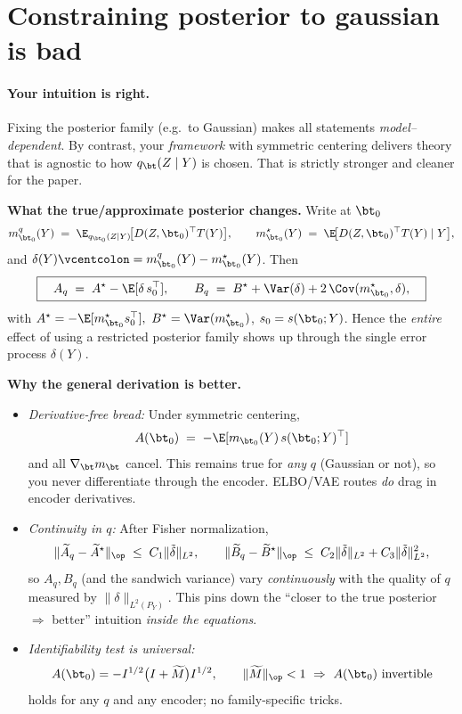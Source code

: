 \section{Constraining posterior to gaussian is bad}

\paragraph{Your intuition is right.} 
Fixing the posterior family (e.g.\ to Gaussian) makes all statements \emph{model–dependent}. 
By contrast, your \emph{framework} with symmetric centering delivers theory that is agnostic to how $q_\bt(Z\mid Y)$ is chosen. 
That is strictly stronger and cleaner for the paper.

\medskip
\noindent\textbf{What the true/approximate posterior changes.}
Write at $\bt_0$
\[
m_{\bt_0}^q(Y)\;=\;\E_{q_{\bt_0}(Z\mid Y)}\!\big[D(Z,\bt_0)^\top T(Y)\big],
\qquad
m_{\bt_0}^\star(Y)\;=\;\E\!\big[D(Z,\bt_0)^\top T(Y)\mid Y\big],
\]
and $\delta(Y)\vcentcolon=m_{\bt_0}^q(Y)-m_{\bt_0}^\star(Y)$. Then
\[
\boxed{\quad
A_q \;=\; A^\star - \E[\delta\,s_0^\top],\qquad
B_q \;=\; B^\star + \Var(\delta)+2\,\Cov(m^\star_{\bt_0},\delta),
\quad}
\]
with $A^\star=-\E[m^\star_{\bt_0}s_0^\top],~ B^\star=\Var(m^\star_{\bt_0})$, $s_0=s(\bt_0;Y)$. 
Hence the \emph{entire} effect of using a restricted posterior family shows up through the single error process $\delta(Y)$.

\medskip
\noindent\textbf{Why the general derivation is better.}
\begin{itemize}
\item \emph{Derivative-free bread:} Under symmetric centering,
\[
A(\bt_0)\;=\;-\E[m_{\bt_0}(Y)\,s(\bt_0;Y)^\top]
\]
and all $\nabla_\bt m_\bt$ cancel. This remains true for \emph{any} $q$ (Gaussian or not), so you never differentiate through the encoder. ELBO/VAE routes \emph{do} drag in encoder derivatives.
\item \emph{Continuity in $q$:} After Fisher normalization,
\[
\|\widetilde A_q-\widetilde A^\star\|_{\op}
\;\le\;C_1\|\tilde\delta\|_{L^2},\qquad
\|\widetilde B_q-\widetilde B^\star\|_{\op}
\;\le\;C_2\|\tilde\delta\|_{L^2}+C_3\|\tilde\delta\|_{L^2}^2,
\]
so $A_q,B_q$ (and the sandwich variance) vary \emph{continuously} with the quality of $q$ measured by $\|\delta\|_{L^2(P_Y)}$. This pins down the “closer to the true posterior $\Rightarrow$ better” intuition \emph{inside the equations}.
\item \emph{Identifiability test is universal:} 
\[
A(\bt_0)=-I^{1/2}\big(I+\widetilde M\big)I^{1/2},\qquad
\|\widetilde M\|_{\op}<1\ \Rightarrow\ A(\bt_0)\ \text{invertible}
\]
holds for any $q$ and any encoder; no family-specific tricks.
\end{itemize}

